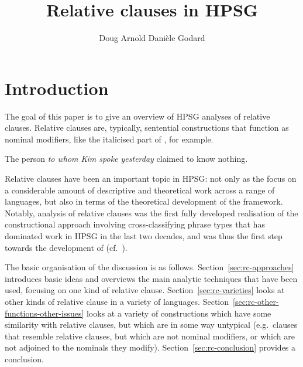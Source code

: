 \documentclass[output=paper
 	        ,biblatex
                ,babelshorthands
                ,newtxmath
                ,draftmode
                ,colorlinks, citecolor=brown
]{langscibook}
\title{Relative clauses in HPSG}
\author{%
 Doug Arnold\affiliation{University of Essex}\lastand 
 Danièle Godard\affiliation{University de Paris Diderot}
}
\begin{document}
\maketitle
\label{chap-relative-clauses}


\section{Introduction}
\label{sec:rc-introduction}

The goal of this paper is to give an overview of HPSG analyses of
relative clauses. Relative clauses are, typically, sentential constructions that function as nominal
modifiers, like the italicised part of , for example.
\begin{exe}\ex
    \label{x:rc-1} The person \emph{to whom Kim spoke yesterday} claimed to know nothing.
\end{exe}
Relative clauses have been an important topic in HPSG: not only as the focus on a
considerable amount of descriptive and theoretical work across a range of languages, but
also in terms of the theoretical development of the framework. Notably, 
analysis of  relative clauses was the first fully developed realisation of the
constructional approach involving cross-classifying phrase types that has dominated work
in HPSG in the last two decades, and was thus the first step towards the development of
 (cf.\ ).

The basic organisation of the discussion is as follows. Section~\ref{sec:rc-approaches}
introduces basic ideas and overviews the main analytic techniques that have been used, focusing
on one kind of relative clause. Section~\ref{sec:rc-varieties} looks at other kinds of
relative clause in a variety of languages. Section~\ref{sec:rc-other-functions-other-issues}
looks at a variety of constructions which have some similarity with relative clauses, but which are in
some way untypical (e.g.\ clauses that resemble relative clauses, but which are not
nominal modifiers, or which are not adjoined to the nominals they
modify). Section~\ref{sec:rc-conclusion} provides a conclusion.
\end{document}
